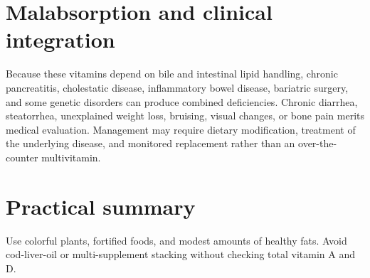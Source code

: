 \section{Malabsorption and clinical integration}
Because these vitamins depend on bile and intestinal lipid handling, chronic pancreatitis, cholestatic disease, inflammatory bowel disease, bariatric surgery, and some genetic disorders can produce combined deficiencies. Chronic diarrhea, steatorrhea, unexplained weight loss, bruising, visual changes, or bone pain merits medical evaluation. Management may require dietary modification, treatment of the underlying disease, and monitored replacement rather than an over-the-counter multivitamin.

\section{Practical summary}
Use colorful plants, fortified foods, and modest amounts of healthy fats. Avoid cod-liver-oil or multi-supplement stacking without checking total vitamin A and D.

